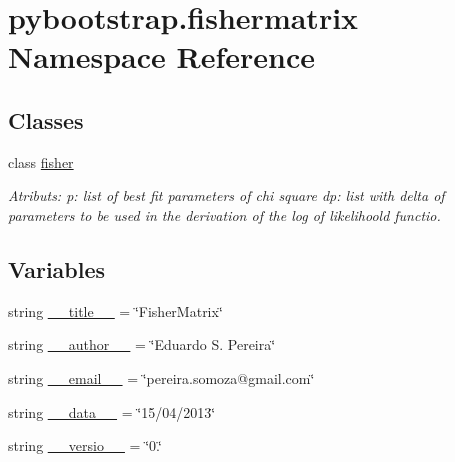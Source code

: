 \hypertarget{namespacepybootstrap_1_1fishermatrix}{\section{pybootstrap.\-fishermatrix Namespace Reference}
\label{namespacepybootstrap_1_1fishermatrix}
}
\subsection*{Classes}
\begin{DoxyCompactItemize}
\item 
class \hyperlink{classpybootstrap_1_1fishermatrix_1_1fisher}{fisher}
\begin{DoxyCompactList}\small\item\em Atributs\-: p\-: list of best fit parameters of chi square dp\-: list with delta of parameters to be used in the derivation of the log of likelihoold functio. \end{DoxyCompactList}\end{DoxyCompactItemize}
\subsection*{Variables}
\begin{DoxyCompactItemize}
\item 
string \hyperlink{namespacepybootstrap_1_1fishermatrix_a6be5abab1eee0d5fcb07ea0c359954e4}{\-\_\-\-\_\-title\-\_\-\-\_\-} = \char`\"{}Fisher\-Matrix\char`\"{}
\item 
string \hyperlink{namespacepybootstrap_1_1fishermatrix_a644402150560da2b17c276223f391c68}{\-\_\-\-\_\-author\-\_\-\-\_\-} = \char`\"{}Eduardo S. Pereira\char`\"{}
\item 
string \hyperlink{namespacepybootstrap_1_1fishermatrix_ae9470b31d0dda4732c30ee307b18dd55}{\-\_\-\-\_\-email\-\_\-\-\_\-} = \char`\"{}pereira.\-somoza@gmail.\-com\char`\"{}
\item 
string \hyperlink{namespacepybootstrap_1_1fishermatrix_ab9d599538bc14e05d183f7889c61c65c}{\-\_\-\-\_\-data\-\_\-\-\_\-} = \char`\"{}15/04/2013\char`\"{}
\item 
string \hyperlink{namespacepybootstrap_1_1fishermatrix_adfa5024b06b8002cd775dcc06562625d}{\-\_\-\-\_\-versio\-\_\-\-\_\-} = \char`\"{}0.\char`\"{}
\end{DoxyCompactItemize}


